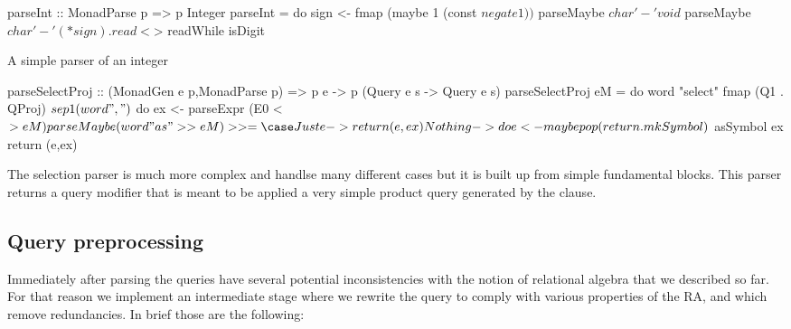\begin{code}
  \begin{haskellcode}
    parseInt :: MonadParse p => p Integer
    parseInt = do
    sign <- fmap (maybe 1 (const $ negate 1)) $ parseMaybe $ char '-'
    void $ parseMaybe $ char '-'
    (* sign) . read <$> readWhile isDigit
  \end{haskellcode}
  \caption{\label{org463a483}A simple parser of an integer}
\end{code}

\begin{code}
  \begin{haskellcode}
    parseSelectProj
      :: (MonadGen e p,MonadParse p)
      => p e -> p (Query e s -> Query e s)
    parseSelectProj eM = do
      word "select"
      fmap (Q1 . QProj) $ sep1 (word ",") $ do
      ex <- parseExpr (E0 <$> eM)
      parseMaybe (word "as" >> eM) >>= \case
        Just e -> return (e,ex)
        Nothing -> do
      e <- maybe pop (return . mkSymbol) $ asSymbol ex
      return (e,ex)
   \end{haskellcode}
  \caption{\label{org39b9e41}The selection parser is much more complex
and handlse many different cases but it is built up from simple
fundamental blocks. This parser returns a query modifier that is meant
to be applied a very simple product query generated by the 
clause.}
\end{code}
\subsection{Query preprocessing}
\label{sec:orgd903905}
Immediately after parsing the queries have several potential
inconsistencies with the notion of relational algebra that we
described so far. For that reason we implement an intermediate stage
where we rewrite the query to comply with various properties of the
RA, and which remove redundancies. In brief those are the following:

